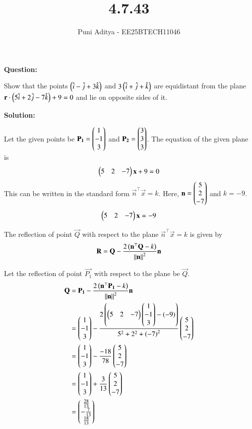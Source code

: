 \documentclass[journal]{IEEEtran}
\begin{document}
\title{4.7.43}
\author{Puni Aditya - EE25BTECH11046}
\maketitle

\textbf{Question:}

Show that the points $\left(\hat{i}-\hat{j}+3\hat{k}\right)$ and $3\left(\hat{i}+\hat{j}+\hat{k}\right)$ are equidistant from the plane $\mathbf{r}\cdot\left(5\hat{i}+2\hat{j}-7\hat{k}\right) + 9 = 0$ and lie on opposite sides of it.

\textbf{Solution:}

Let the given points be $\mathbf{P_1} = \begin{pmatrix}1 \\ -1 \\ 3\end{pmatrix}$ and $\mathbf{P_2} = \begin{pmatrix}3 \\ 3 \\ 3\end{pmatrix}$.
The equation of the given plane is
\begin{align}
    \begin{pmatrix}5 & 2 & -7\end{pmatrix}\mathbf{x} + 9 = 0
\end{align}
This can be written in the standard form $\vec{n}^\top\vec{x} = k$. Here, $\mathbf{n} = \begin{pmatrix}5 \\ 2 \\ -7\end{pmatrix}$ and $k = -9$.
\begin{align}
    \begin{pmatrix}5 & 2 & -7\end{pmatrix}\mathbf{x} = -9 \label{eq:plane_eqn}
\end{align}

The reflection of point $\vec{Q}$ with respect to the plane $\vec{n}^\top\vec{x}=k$ is given by
\begin{align}
    \mathbf{R} = \mathbf{Q} - \frac{2\left(\mathbf{n}^\top\mathbf{Q}-k\right)}{\left\lVert\mathbf{n}\right\rVert^2}\mathbf{n}
\end{align}

Let the reflection of point $\vec{P_1}$ with respect to the plane be $\vec{Q}$.
\begin{align}
    \mathbf{Q} &= \mathbf{P_1} - \frac{2\left(\mathbf{n}^\top\mathbf{P_1}-k\right)}{\left\lVert\mathbf{n}\right\rVert^2}\mathbf{n} \\
    &= \begin{pmatrix}1 \\ -1 \\ 3\end{pmatrix} - \frac{2\left(\begin{pmatrix}5 & 2 & -7\end{pmatrix}\begin{pmatrix}1 \\ -1 \\ 3\end{pmatrix} - \left(-9\right)\right)}{5^2 + 2^2 + \left(-7\right)^2}\begin{pmatrix}5 \\ 2 \\ -7\end{pmatrix} \\
    &= \begin{pmatrix}1 \\ -1 \\ 3\end{pmatrix} - \frac{-18}{78}\begin{pmatrix}5 \\ 2 \\ -7\end{pmatrix} \\
    &= \begin{pmatrix}1 \\ -1 \\ 3\end{pmatrix} + \frac{3}{13}\begin{pmatrix}5 \\ 2 \\ -7\end{pmatrix} \\
    &= \begin{pmatrix}\frac{28}{13} \\ -\frac{7}{13} \\ \frac{18}{13}\end{pmatrix}
\end{align}
\end{document}
